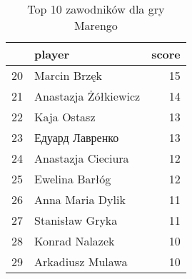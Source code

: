 
\begin{table}[h]
\caption{Top 10 zawodników dla gry Marengo}\label{tab:top10_3}
\centering
\begin{tabular}{rlr}
\hline
    & player               &   score \\
\hline
 20 & Marcin Brzęk         &      15 \\
 21 & Anastazja Żółkiewicz &      14 \\
 22 & Kaja Ostasz          &      13 \\
 23 & Едуард Лавренко      &      13 \\
 24 & Anastazja Cieciura   &      12 \\
 25 & Ewelina Barłóg       &      12 \\
 26 & Anna Maria Dylik     &      11 \\
 27 & Stanisław Gryka      &      11 \\
 28 & Konrad Nalazek       &      10 \\
 29 & Arkadiusz Mulawa     &      10 \\
\hline
\end{tabular}
\end{table}
